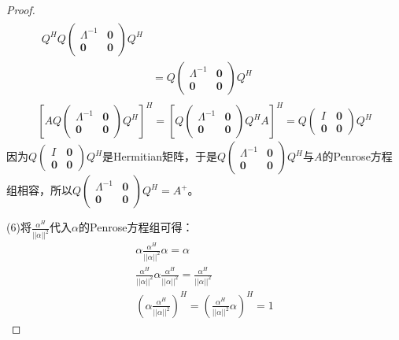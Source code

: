 \begin{proof}
\begin{gather*}
\begin{aligned}
			Q^HQ
			\begin{pmatrix}
				\varLambda^{-1} & \mathbf{0} \\
				\mathbf{0} & \mathbf{0}
			\end{pmatrix}
			Q^H \\
			&=Q
			\begin{pmatrix}
				\varLambda^{-1} & \mathbf{0} \\
				\mathbf{0} & \mathbf{0}
			\end{pmatrix}
			Q^H
		\end{aligned} \\
		\left[AQ
		\begin{pmatrix}
			\varLambda^{-1} & \mathbf{0} \\
			\mathbf{0} & \mathbf{0}
		\end{pmatrix}
		Q^H\right]^H
		=
		\left[Q
		\begin{pmatrix}
			\varLambda^{-1} & \mathbf{0} \\
			\mathbf{0} & \mathbf{0}
		\end{pmatrix}
		Q^HA\right]^H
		=Q
		\begin{pmatrix}
			I & \mathbf{0} \\
			\mathbf{0} & \mathbf{0}
		\end{pmatrix}
		Q^H
	\end{gather*}
	因为$Q
	\begin{pmatrix}
		I & \mathbf{0} \\
		\mathbf{0} & \mathbf{0}
	\end{pmatrix}
	Q^H$是Hermitian矩阵，于是$Q
	\begin{pmatrix}
		\varLambda^{-1} & \mathbf{0} \\
		\mathbf{0} & \mathbf{0}
	\end{pmatrix}Q^H$与$A$的Penrose方程组相容，所以$Q
	\begin{pmatrix}
	\varLambda^{-1} & \mathbf{0} \\
	\mathbf{0} & \mathbf{0}
	\end{pmatrix}Q^H=A^+$。\par
	(6)将$\frac{\alpha^H}{||\alpha||^2}$代入$\alpha$的Penrose方程组可得：
	\begin{gather*}
		\alpha\frac{\alpha^H}{||\alpha||^2}\alpha=\alpha  \\
		\frac{\alpha^H}{||\alpha||^2}\alpha\frac{\alpha^H}{||\alpha||^2}=\frac{\alpha^H}{||\alpha||^2} \\
		\left(\alpha\frac{\alpha^H}{||\alpha||^2}\right)^H=\left(\frac{\alpha^H}{||\alpha||^2}\alpha\right)^H=1
	\end{gather*}

\end{proof}
